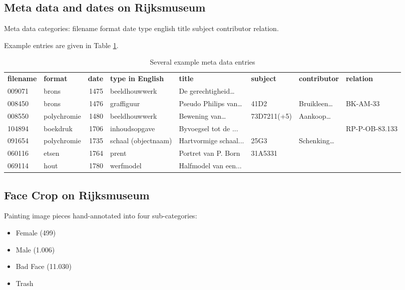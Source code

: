 \documentclass[runningheads]{llncs}
\newcommand{\fillertext}{\textcolor{black!20}{\lipsum[5-6]}}
\begin{document}
\fillertext

\subsection{Meta data and dates on Rijksmuseum}
Meta data categories: filename	format	date	type english	title	subject	contributor	relation.

Example entries are given in Table \ref{tab:RijksMetaData}.

\begin{table}
	\centering
	\caption{Several example meta data entries}\label{tab:RijksMetaData}
	\hspace{1cm}\tiny
	\begin{tabular}{llrlllll}
		\bfseries filename & \bfseries format & \bfseries date & \bfseries type in English & \bfseries title & \bfseries subject & \bfseries contributor & \bfseries relation\\
009071 & brons 		& 1475 & beeldhouwwerk 		& De gerechtigheid\dots &  &  & \\
008450 & brons 		& 1476 & graffiguur 	& Pseudo Philips van\dots& 41D2 & Bruikleen\dots & BK-AM-33\\
008550 & polychromie& 1480 & beeldhouwwerk 		& Bewening van\dots & 73D7211(+5) & Aankoop\dots & \\
104894 & boekdruk 	& 1706 & inhoudsopgave & Byvoegsel tot de ... &  &  & RP-P-OB-83.133\\
091654 & polychromie& 1735 & schaal (objectnaam) & Hartvormige schaal... & 25G3 & Schenking\dots & \\
060116 & etsen 		& 1764 & prent & Portret van P. Born & 31A5331 &  & \\
069114 & hout 		& 1780 & werfmodel & Halfmodel van een... &  &  & \\
	\end{tabular}
\end{table}

\subsection{Face Crop on Rijksmuseum}
Painting\cite{rijksmuseum1976tot} image pieces hand-annotated into four sub-categories:

\begin{itemize}
	\item Female (499)
	\item Male (1.006)
	\item Bad Face (11.030)
	\item Trash
\end{itemize}
\end{document}
